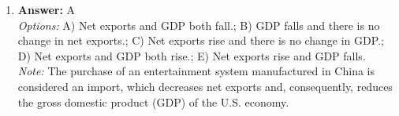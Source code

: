 \documentclass[12pt]{article}
\begin{document}
\begin{enumerate}[label=\arabic*.]
\\ \textit{Note:} In the long run, a perfectly competitive firm operates where price equals the minimum average total cost, not the minimum average variable cost, as firms must cover all costs to remain in the market.
\item \textbf{Answer:} A
\\ \textit{Options:} A) Net exports and GDP both fall.; B) GDP falls and there is no change in net exports.; C) Net exports rise and there is no change in GDP.; D) Net exports and GDP both rise.; E) Net exports rise and GDP falls.
\\ \textit{Note:} The purchase of an entertainment system manufactured in China is considered an import, which decreases net exports and, consequently, reduces the gross domestic product (GDP) of the U.S. economy.
\end{enumerate}
\end{document}
